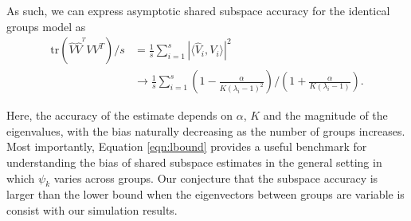 \documentclass{statsoc}
\newcommand{\tr}{\text{tr}}
\begin{document}
\noindent As such, we can express asymptotic shared subspace
accuracy for the identical groups model as
\begin{align}
\nonumber \tr(\hat{V}\hat{V}^{^T}VV^T)/s &= \frac{1}{s}\sum_{i=1}^s |\langle\hat{V}_i, V_i\rangle|^2\\
&\to \frac{1}{s}\sum_{i=1}^s  \left(1-\frac{\alpha}{K(\lambda_i - 1)^2}\right) /\left(1 +
    \frac{\alpha}{K(\lambda_i - 1)}\right).
\label{eqn:lbound}
\end{align}



Here, the accuracy of the estimate depends on $\alpha$, $K$ and the
magnitude of the eigenvalues, with the bias naturally decreasing as the number
of groups increases.  Most importantly, Equation
\ref{eqn:lbound} provides a useful benchmark for understanding the
bias of shared subspace estimates in the general setting in which
$\psi_k$ varies across groups.  Our conjecture that the subspace
accuracy is larger than the lower bound when the eigenvectors between
groups are variable is consist with our simulation results.

\end{document}
